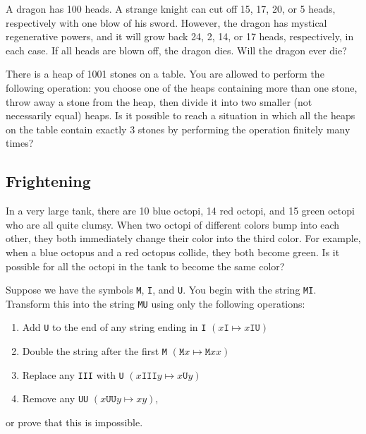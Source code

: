 \documentclass{article}
\begin{document}
    \begin{exercise}
        A dragon has 100 heads. A strange knight can cut off 15, 17, 20, or 5 heads, respectively with one blow of his sword. However, the dragon has mystical regenerative powers, and it will grow back 24, 2, 14, or 17 heads, respectively, in each case. If all heads are blown off, the dragon dies. Will the dragon ever die?
    \end{exercise}

    \begin{exercise}
        There is a heap of 1001 stones on a table. You are allowed to perform the following operation: you choose one of the heaps containing more than one stone, throw away a stone from the heap, then divide it into two smaller (not necessarily equal) heaps. Is it possible to reach a situation in which all the heaps on the table contain exactly 3 stones by performing the operation finitely many times?
    \end{exercise}

\subsection*{Frightening}

    \begin{exercise}
            In a very large tank, there are 10 blue octopi, 14 red octopi, and 15 green octopi who are all quite clumsy.
            When two octopi of different colors bump into each other, they both immediately change their color into the third color.
            For example, when a blue octopus and a red octopus collide, they both become green.
            Is it possible for all the octopi in the tank to become the same color?
        \end{exercise}

    \begin{exercise} %
        Suppose we have the symbols \texttt{M}, \texttt{I}, and \texttt{U}.
        You begin with the string \texttt{MI}.
        Transform this into the string \texttt{MU} using only the following operations:
        \begin{enumerate}
            \item Add \texttt{U} to the end of any string ending in \texttt{I} \((x\texttt{I}\mapsto x\texttt{IU})\)
            \item Double the string after the first \texttt{M} \((\texttt{M}x\mapsto\texttt{M}xx)\)
            \item Replace any \texttt{III} with \texttt{U} \((x\texttt{III}y\mapsto x\texttt{U}y)\)
            \item Remove any \texttt{UU} \((x\texttt{UU}y\mapsto xy)\),
        \end{enumerate}
        or prove that this is impossible.
    \end{exercise}
\end{document}
